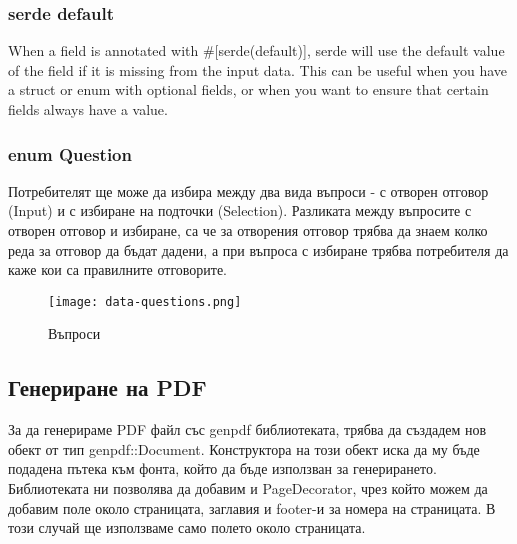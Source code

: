 \subsubsection{serde default}
When a field is annotated with \#[serde(default)], serde will use the default
value of the field if it is missing from the input data. This can be useful
when you have a struct or enum with optional fields, or when you want to ensure
that certain fields always have a value.


\subsubsection{enum Question}
Потребителят ще може да избира между два вида въпроси - с отворен отговор
(Input) и с избиране на подточки (Selection). Разликата между въпросите с
отворен отговор и избиране, са че за отворения отговор трябва да знаем колко
реда за отговор да бъдат дадени, а при въпроса с избиране трябва потребителя да
каже кои са правилните отговорите.

\begin{figure}[!htb]
  \texttt{[image: data-questions.png]}
  \centering
  \caption{Въпроси}
  \label{fig:data-questions}
\end{figure}

\subsection{Генериране на PDF}
За да генерираме PDF файл със genpdf библиотеката, трябва да създадем нов обект
от тип genpdf::Document. Конструктора на този обект иска да му бъде подадена
пътека към фонта, който да бъде използван за генерирането. Библиотеката ни
позволява да добавим и PageDecorator, чрез който можем да добавим поле около
страницата, заглавия и footer-и за номера на страницата. В този случай ще
използваме само полето около страницата.


